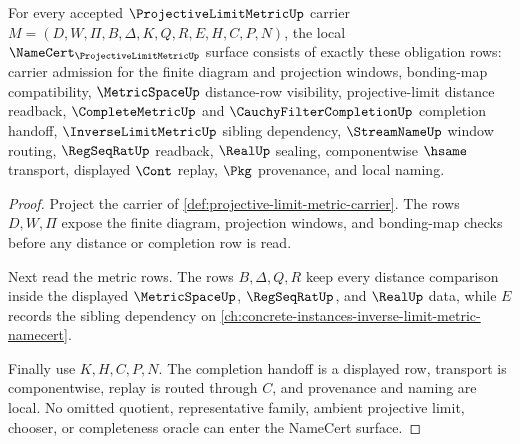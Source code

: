 \begin{theorem}
\label{thm:projective-limit-metric-namecert-obligations}
For every accepted $\ProjectiveLimitMetricUp$ carrier $M=(D,W,\Pi,B,\Delta,K,Q,R,E,H,C,P,N)$, the local $\NameCert_{\ProjectiveLimitMetricUp}$ surface consists of exactly these obligation rows: carrier admission for the finite diagram and projection windows, bonding-map compatibility, $\MetricSpaceUp$ distance-row visibility, projective-limit distance readback, $\CompleteMetricUp$ and $\CauchyFilterCompletionUp$ completion handoff, $\InverseLimitMetricUp$ sibling dependency, $\StreamNameUp$ window routing, $\RegSeqRatUp$ readback, $\RealUp$ sealing, componentwise $\hsame$ transport, displayed $\Cont$ replay, $\Pkg$ provenance, and local naming.
\end{theorem}
\begin{proof}
Project the carrier of \autoref{def:projective-limit-metric-carrier}. The rows $D,W,\Pi$ expose the finite diagram, projection windows, and bonding-map checks before any distance or completion row is read.

Next read the metric rows. The rows $B,\Delta,Q,R$ keep every distance comparison inside the displayed $\MetricSpaceUp$, $\RegSeqRatUp$, and $\RealUp$ data, while $E$ records the sibling dependency on \autoref{ch:concrete-instances-inverse-limit-metric-namecert}.

Finally use $K,H,C,P,N$. The completion handoff is a displayed row, transport is componentwise, replay is routed through $C$, and provenance and naming are local. No omitted quotient, representative family, ambient projective limit, chooser, or completeness oracle can enter the NameCert surface.
\end{proof}

